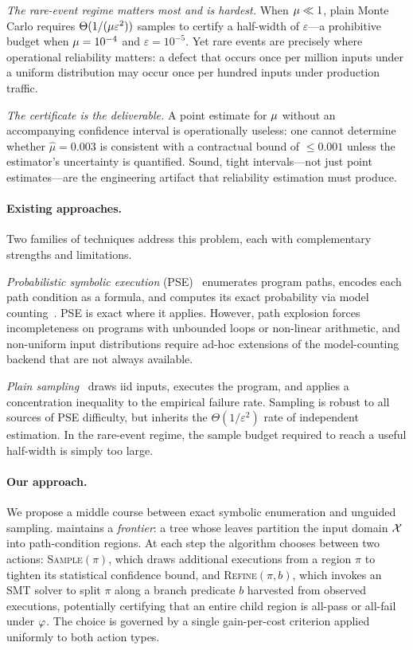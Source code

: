 \emph{The rare-event regime matters most and is hardest.}  When
$\mu \ll 1$, plain Monte Carlo requires $\Theta(1/(\mu
\varepsilon^2))$ samples to certify a half-width of $\varepsilon$---a
prohibitive budget when $\mu = 10^{-4}$ and $\varepsilon =
10^{-5}$.  Yet rare events are precisely where operational reliability
matters: a defect that occurs once per million inputs under a uniform
distribution may occur once per hundred inputs under production
traffic.

\emph{The certificate is the deliverable.}  A point estimate for
$\mu$ without an accompanying confidence interval is operationally
useless: one cannot determine whether $\hat{\mu} = 0.003$ is
consistent with a contractual bound of $\le 0.001$ unless the
estimator's uncertainty is quantified.  Sound, tight intervals---not
just point estimates---are the engineering artifact that reliability
estimation must produce.

\paragraph{Existing approaches.}
Two families of techniques address this problem, each with
complementary strengths and limitations.

\emph{Probabilistic symbolic execution}
(PSE)~\cite{geldenhuys2012pse,filieri2015tacas,borges2014compositional}
enumerates program paths, encodes each path condition as a formula,
and computes its exact probability via model
counting~\cite{chakraborty2013approxmc,yang2023approxmc6}.  PSE is
exact where it applies.  However, path explosion forces incompleteness
on programs with unbounded loops or non-linear arithmetic, and
non-uniform input distributions require ad-hoc extensions of the
model-counting backend that are not always available.

\emph{Plain sampling}~\cite{sampson2014passert,kwiatkowska2011prism}
draws iid inputs, executes the program, and applies a concentration
inequality to the empirical failure rate.  Sampling is robust to all
sources of PSE difficulty, but inherits the $\Theta(1/\varepsilon^2)$
rate of independent estimation.  In the rare-event regime, the sample
budget required to reach a useful half-width is simply too large.

\paragraph{Our approach.}
We propose a middle course between exact symbolic enumeration and
unguided sampling.  \toolname{} maintains a \emph{frontier}: a tree whose leaves
partition the input domain $\mathcal{X}$ into path-condition regions.  At
each step the algorithm chooses between two actions:
\textsc{Sample}$(\pi)$, which draws additional executions from a
region $\pi$ to tighten its statistical confidence bound, and
\textsc{Refine}$(\pi, b)$, which invokes an SMT solver to split $\pi$
along a branch predicate $b$ harvested from observed executions,
potentially certifying that an entire child region is all-pass or
all-fail under $\varphi$.  The choice is governed by a single
gain-per-cost criterion applied uniformly to both action types.

